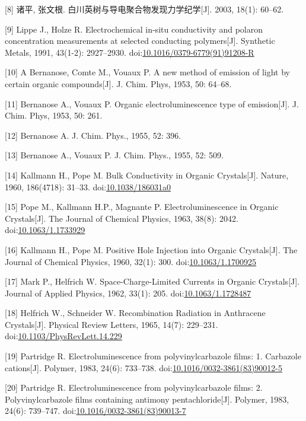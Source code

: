 \documentclass[12pt,]{report}
\begin{document}
{[}8{]} 诸平, 张文根. 白川英树与导电聚合物发现力学纪学{[}J{]}. 2003,
18(1): 60--62.

{[}9{]} Lippe J., Holze R. Electrochemical in-situ conductivity and
polaron concentration measurements at selected conducting
polymers{[}J{]}. Synthetic Metals, 1991, 43(1-2): 2927--2930.
doi:\href{http://dx.doi.org/10.1016/0379-6779(91)91208-R}{10.1016/0379-6779(91)91208-R}

{[}10{]} A Bernanose, Comte M., Vouaux P. A new method of emission of
light by certain organic compounds{[}J{]}. J. Chim. Phys, 1953, 50:
64--68.

{[}11{]} Bernanose A., Vouaux P. Organic electroluminescence type of
emission{[}J{]}. J. Chim. Phys, 1953, 50: 261.

{[}12{]} Bernanose A. J. Chim. Phys., 1955, 52: 396.

{[}13{]} Bernanose A., Vouaux P. J. Chim. Phys., 1955, 52: 509.

{[}14{]} Kallmann H., Pope M. Bulk Conductivity in Organic
Crystals{[}J{]}. Nature, 1960, 186(4718): 31--33.
doi:\href{http://dx.doi.org/10.1038/186031a0}{10.1038/186031a0}

{[}15{]} Pope M., Kallmann H.P., Magnante P. Electroluminescence in
Organic Crystals{[}J{]}. The Journal of Chemical Physics, 1963, 38(8):
2042. doi:\href{http://dx.doi.org/10.1063/1.1733929}{10.1063/1.1733929}

{[}16{]} Kallmann H., Pope M. Positive Hole Injection into Organic
Crystals{[}J{]}. The Journal of Chemical Physics, 1960, 32(1): 300.
doi:\href{http://dx.doi.org/10.1063/1.1700925}{10.1063/1.1700925}

{[}17{]} Mark P., Helfrich W. Space-Charge-Limited Currents in Organic
Crystals{[}J{]}. Journal of Applied Physics, 1962, 33(1): 205.
doi:\href{http://dx.doi.org/10.1063/1.1728487}{10.1063/1.1728487}

{[}18{]} Helfrich W., Schneider W. Recombination Radiation in Anthracene
Crystals{[}J{]}. Physical Review Letters, 1965, 14(7): 229--231.
doi:\href{http://dx.doi.org/10.1103/PhysRevLett.14.229}{10.1103/PhysRevLett.14.229}

{[}19{]} Partridge R. Electroluminescence from polyvinylcarbazole films:
1. Carbazole cations{[}J{]}. Polymer, 1983, 24(6): 733--738.
doi:\href{http://dx.doi.org/10.1016/0032-3861(83)90012-5}{10.1016/0032-3861(83)90012-5}

{[}20{]} Partridge R. Electroluminescence from polyvinylcarbazole films:
2. Polyvinylcarbazole films containing antimony pentachloride{[}J{]}.
Polymer, 1983, 24(6): 739--747.
doi:\href{http://dx.doi.org/10.1016/0032-3861(83)90013-7}{10.1016/0032-3861(83)90013-7}
\end{document}
